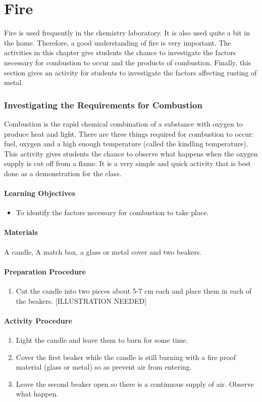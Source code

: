 \chapter{Fire}
Fire is used frequently in the chemistry laboratory. It is also used quite a bit in the home. Therefore, a good understanding of fire is very important.
The activities in this chapter give students the chance to investigate the factors necessary for combustion to occur and the products of combustion. Finally, this section gives an activity for students to investigate the factors affecting rusting of metal.

\subsection{Investigating the Requirements for Combustion}
Combustion is the rapid chemical combination of a substance with oxygen to produce heat and light. There are three things required for combustion to occur: fuel, oxygen and a high enough temperature (called the kindling temperature). This activity gives students the chance to observe what happens when the oxygen supply is cut off from a flame. It is a very simple and quick activity that is best done as a demonstration for the class.
\subsubsection*{Learning Objectives}
\begin{itemize}
\item{To identify the factors necessary for combustion to take place.}
\end{itemize}

\subsubsection*{Materials}
A candle, A match box, a glass or metal cover and two beakers.

\subsubsection*{Preparation Procedure}
\begin{enumerate}
\item{Cut the candle into two pieces about 5-7 cm each and place them in each of the beakers. [ILLUSTRATION NEEDED]}
\end{enumerate}

\subsubsection*{Activity Procedure}
\begin{enumerate}
\item{Light the candle and leave them to burn for some time.}
\item{Cover the first beaker while the candle is still burning with a fire proof material (glass or metal) so as prevent air from entering.}
\item{Leave the second beaker open so there is a continuous supply of air. Observe what happen.}
\end{enumerate}

